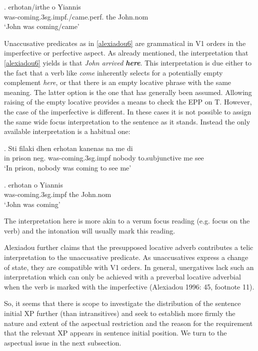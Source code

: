 \documentclass[11pt]{article}
\begin{document}
\exg.
erhotan/irthe o Yiannis\\
was-coming.3sg.impf./came.perf. the John.nom\\ \label{alexiadou6}
`John was coming/came'

Unaccusative predicates as in \ref{alexiadou6} are grammatical in V1 orders in the imperfective or perfective aspect. 
As already mentioned, the interpretation that \ref{alexiadou6} yields is that \textit{John arrived \textbf{here}}. This interpretation is due either to the fact that a verb like \textit{come} inherently selects for a potentially empty complement \textit{here}, or that there is an empty locative phrase with the same meaning.  The latter option is the one that has generally been assumed.  Allowing raising of the empty locative provides a means to check the EPP on T.  However, the case of the imperfective is different.  In these cases it is not possible to assign the same wide focus interpretation to the sentence as it stands. Instead the only available interpretation is a habitual one:

\exg.
Sti filaki dhen erhotan kanenas na me di\\
in  prison neg. was-coming.3sg.impf nobody to.subjunctive me see\\
`In prison, nobody was coming to see me'

\exg.
erhotan o Yiannis\\
was-coming.3sg.impf the John.nom\\ \label{george20}
`John was coming'

The interpretation here is more akin to a verum focus reading (e.g. focus on the verb) and the intonation will usually mark this reading.

Alexiadou further claims that the presupposed locative adverb contributes a telic interpretation to the unaccusative predicate. As unaccusatives express a change of state, they are compatible with V1 orders.
In general, unergatives lack such an interpretation which can only be achieved with a preverbal locative adverbial when the verb is marked with the imperfective (Alexiadou 1996: 45, footnote 11).  

So, it seems that there is scope to investigate the distribution of the sentence initial XP further (than intransitives) and seek to establish more firmly the nature and extent of the aspectual restriction and the reason for the requirement that the relevant XP appears in sentence initial position.  We turn to the aspectual issue in the next subsection.
\end{document}
